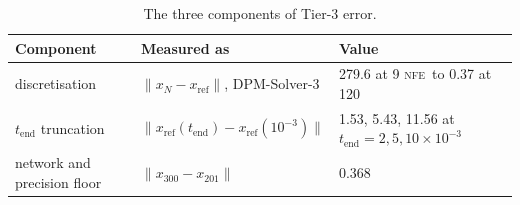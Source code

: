 \documentclass[sigconf]{acmart}
\newcommand{\NFE}{\textsc{nfe}}
\newcommand{\tend}{t_{\text{end}}}
\begin{document}
\begin{table}[t]
\caption{The three components of Tier-3 error.}
\label{tab:decomp}
\small
\begin{tabular}{@{}p{2.1cm}p{3.15cm}p{2.3cm}@{}}
\toprule
Component & Measured as & Value \\
\midrule
discretisation & $\lVert x_N-x_{\text{ref}}\rVert$, DPM-Solver-3 & 279.6 at 9 \NFE\ to 0.37 at 120 \\
$\tend$ truncation & $\lVert x_{\text{ref}}(\tend)-x_{\text{ref}}(10^{-3})\rVert$ & 1.53, 5.43, 11.56 at $\tend=2,5,10\times10^{-3}$ \\
network and precision floor & $\lVert x_{300}-x_{201}\rVert$ & 0.368 \\
\bottomrule
\end{tabular}
\end{table}
\end{document}
